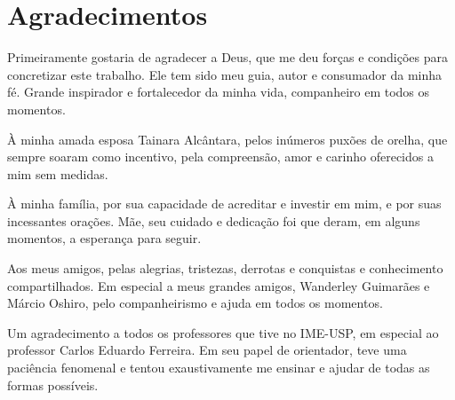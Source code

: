 \chapter*{Agradecimentos}

Primeiramente gostaria de agradecer a Deus, que me deu forças e 
condições para concretizar este trabalho. Ele tem sido meu guia, autor e 
consumador da minha fé. Grande inspirador e fortalecedor da minha vida, 
companheiro em todos os momentos.

À minha amada esposa Tainara Alcântara, pelos inúmeros puxões
de orelha, que sempre soaram como incentivo, pela compreensão, amor e 
carinho oferecidos a mim sem medidas.

À minha família, por sua capacidade de acreditar e investir em mim, e 
por suas incessantes orações. Mãe, seu cuidado e dedicação foi que 
deram, em alguns momentos, a esperança para seguir.

Aos meus amigos, pelas alegrias, tristezas, derrotas e conquistas e 
conhecimento compartilhados. Em especial a meus grandes amigos, 
Wanderley Guimarães e Márcio Oshiro, pelo companheirismo e ajuda em 
todos os momentos.

Um agradecimento a todos os professores que tive no IME-USP, em especial 
ao professor Carlos Eduardo Ferreira. Em seu papel de orientador, teve 
uma paciência fenomenal e tentou exaustivamente me ensinar e ajudar de 
todas as formas possíveis.

